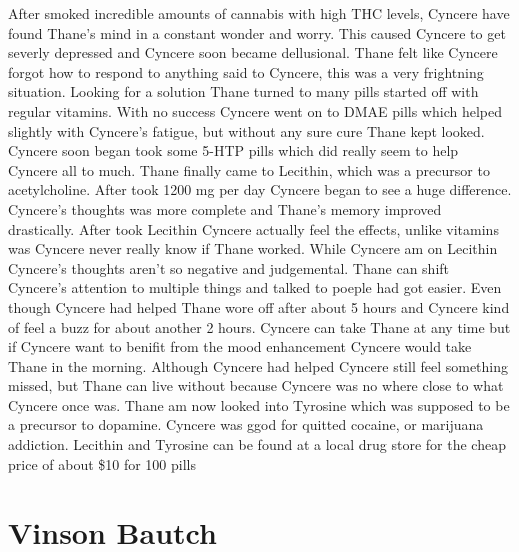 \documentclass[12pt]{book}
\begin{document}
After smoked incredible amounts of cannabis with high THC levels, Cyncere have found Thane's mind in a constant wonder and worry. This caused Cyncere to get severly depressed and Cyncere soon became dellusional. Thane felt like Cyncere forgot how to respond to anything said to Cyncere, this was a very frightning situation. Looking for a solution Thane turned to many pills started off with regular vitamins. With no success Cyncere went on to DMAE pills which helped slightly with Cyncere's fatigue, but without any sure cure Thane kept looked. Cyncere soon began took some 5-HTP pills which did really seem to help Cyncere all to much. Thane finally came to Lecithin, which was a precursor to acetylcholine. After took 1200 mg per day Cyncere began to see a huge difference. Cyncere's thoughts was more complete and Thane's memory improved drastically. After took Lecithin Cyncere actually feel the effects, unlike vitamins was Cyncere never really know if Thane worked. While Cyncere am on Lecithin Cyncere's thoughts aren't so negative and judgemental. Thane can shift Cyncere's attention to multiple things and talked to poeple had got easier. Even though Cyncere had helped Thane wore off after about 5 hours and Cyncere kind of feel a buzz for about another 2 hours. Cyncere can take Thane at any time but if Cyncere want to benifit from the mood enhancement Cyncere would take Thane in the morning. Although Cyncere had helped Cyncere still feel something missed, but Thane can live without because Cyncere was no where close to what Cyncere once was. Thane am now looked into Tyrosine which was supposed to be a precursor to dopamine. Cyncere was ggod for quitted cocaine, or marijuana addiction. Lecithin and Tyrosine can be found at a local drug store for the cheap price of about \$10 for 100 pills



\chapter{Vinson Bautch}
\end{document}
